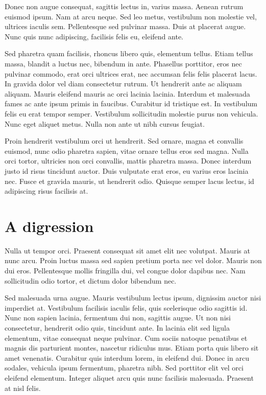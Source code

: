 \documentclass[9pt]{memoir}
\begin{document}
Donec non augue consequat, sagittis lectus in, varius massa. Aenean rutrum euismod ipsum. Nam at arcu neque. Sed leo metus, vestibulum non molestie vel, ultrices iaculis sem. Pellentesque sed pulvinar massa. Duis at placerat augue. Nunc quis nunc adipiscing, facilisis felis eu, eleifend ante.

Sed pharetra quam facilisis, rhoncus libero quis, elementum tellus. Etiam tellus massa, blandit a luctus nec, bibendum in ante. Phasellus porttitor, eros nec pulvinar commodo, erat orci ultrices erat, nec accumsan felis felis placerat lacus. In gravida dolor vel diam consectetur rutrum. Ut hendrerit ante ac aliquam aliquam. Mauris eleifend mauris ac orci lacinia lacinia. Interdum et malesuada fames ac ante ipsum primis in faucibus. Curabitur id tristique est. In vestibulum felis eu erat tempor semper. Vestibulum sollicitudin molestie purus non vehicula. Nunc eget aliquet metus. Nulla non ante ut nibh cursus feugiat.

Proin hendrerit vestibulum orci ut hendrerit. Sed ornare, magna et convallis euismod, nunc odio pharetra sapien, vitae ornare tellus eros sed magna. Nulla orci tortor, ultricies non orci convallis, mattis pharetra massa. Donec interdum justo id risus tincidunt auctor. Duis vulputate erat eros, eu varius eros lacinia nec. Fusce et gravida mauris, ut hendrerit odio. Quisque semper lacus lectus, id adipiscing risus facilisis at.

\section{A digression}
Nulla ut tempor orci. Praesent consequat sit amet elit nec volutpat. Mauris at nunc arcu. Proin luctus massa sed sapien pretium porta nec vel dolor. Mauris non dui eros. Pellentesque mollis fringilla dui, vel congue dolor dapibus nec. Nam sollicitudin odio tortor, et dictum dolor bibendum nec.

Sed malesuada urna augue. Mauris vestibulum lectus ipsum, dignissim auctor nisi imperdiet at. Vestibulum facilisis iaculis felis, quis scelerisque odio sagittis id. Nunc non sapien lacinia, fermentum dui non, sagittis augue. Ut non nisi consectetur, hendrerit odio quis, tincidunt ante. In lacinia elit sed ligula elementum, vitae consequat neque pulvinar. Cum sociis natoque penatibus et magnis dis parturient montes, nascetur ridiculus mus. Etiam porta quis libero sit amet venenatis. Curabitur quis interdum lorem, in eleifend dui. Donec in arcu sodales, vehicula ipsum fermentum, pharetra nibh. Sed porttitor elit vel orci eleifend elementum. Integer aliquet arcu quis nunc facilisis malesuada. Praesent at nisl felis.
\end{document}
